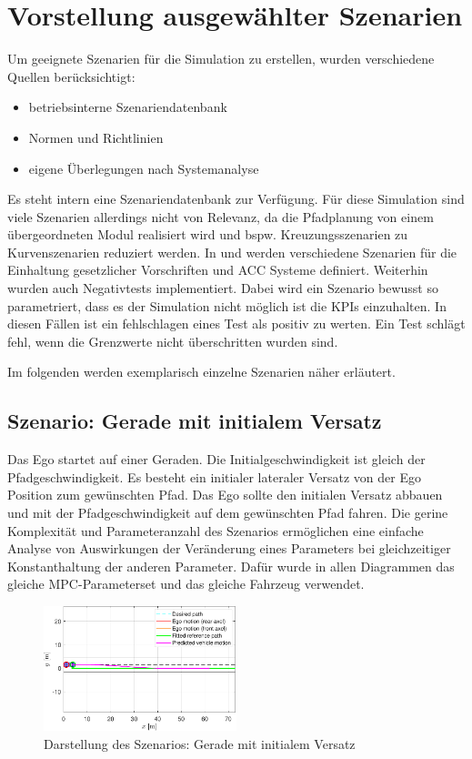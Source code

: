\chapter{Vorstellung ausgewählter Szenarien} \label{chap:Vorstellung_Szenarien}
\thispagestyle{empty}
Um geeignete Szenarien für die Simulation zu erstellen, wurden verschiedene Quellen berücksichtigt:
\begin{itemize}
    \item betriebsinterne Szenariendatenbank
    \item Normen und Richtlinien 
    \item eigene Überlegungen nach Systemanalyse
\end{itemize}
Es steht intern eine Szenariendatenbank zur Verfügung. Für diese Simulation sind viele Szenarien allerdings nicht von Relevanz, da die Pfadplanung von einem übergeordneten Modul realisiert wird und bspw. Kreuzungsszenarien zu Kurvenszenarien reduziert werden. In \cite{ISO15622} und \cite{NCAP2024} werden verschiedene Szenarien für die Einhaltung gesetzlicher Vorschriften und ACC Systeme definiert. Weiterhin wurden auch Negativtests implementiert. Dabei wird ein Szenario bewusst so parametriert, dass es der Simulation nicht möglich ist die KPIs einzuhalten. In diesen Fällen ist ein fehlschlagen eines Test als positiv zu werten. Ein Test schlägt fehl, wenn die Grenzwerte nicht überschritten wurden sind.\medskip

\noindent Im folgenden werden exemplarisch einzelne Szenarien näher erläutert. 

\section{Szenario: Gerade mit initialem Versatz} \label{sec:straight_offset}
Das Ego startet auf einer Geraden. Die Initialgeschwindigkeit ist gleich der Pfadgeschwindigkeit. Es besteht ein initialer lateraler Versatz von der Ego Position zum gewünschten Pfad. Das Ego sollte den initialen Versatz abbauen und mit der Pfadgeschwindigkeit auf dem gewünschten Pfad fahren. Die gerine Komplexität und Parameteranzahl des Szenarios ermöglichen eine einfache Analyse von Auswirkungen der Veränderung eines Parameters bei gleichzeitiger Konstanthaltung der anderen Parameter. Dafür wurde in allen Diagrammen das gleiche MPC-Parameterset und das gleiche Fahrzeug verwendet.
\begin{figure}[ht]
    \centering
    \includegraphics[width=0.5\textwidth]{figures/3_Implementierung/Straight_Offset/test_straight_depiction.pdf}
    \caption{Darstellung des Szenarios: Gerade mit initialem Versatz}
    \label{fig:test_straight_depiction}
\end{figure}

